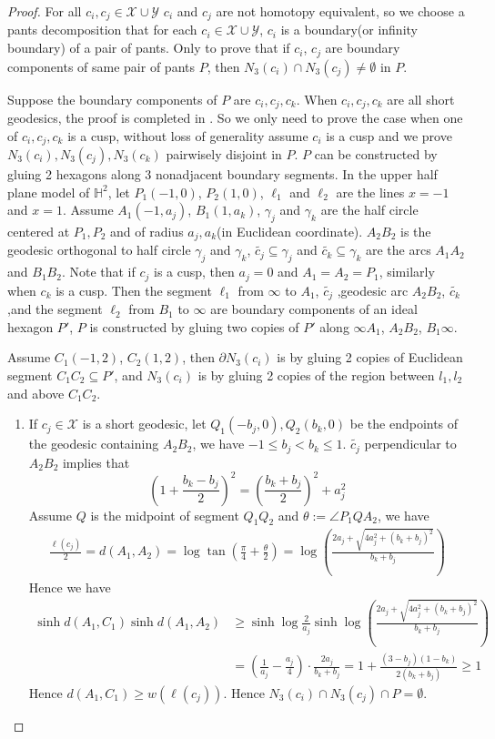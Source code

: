 \documentclass[11pt, a4paper]{article}
\theoremstyle{definition}
\theoremstyle{remark}
\newcommand{\bbh}{\mathbb{H}}
\newcommand{\calx}{\mathcal{X}}
\newcommand{\caly}{\mathcal{Y}}
\newcommand{\bracket}[1]{\left( #1 \right)}
\begin{document}
\begin{proof}
 For all $c_i,c_j\in\calx\cup\caly$ $c_i$ and $c_j$ are not homotopy equivalent, so we choose a pants decomposition that for each $c_i\in\calx\cup\caly$, $c_i$ is a boundary(or infinity boundary) of a pair of pants. Only to prove that if $c_i$, $c_j$ are boundary components of same pair of pants $P$, then $N_3(c_i)\cap N_3(c_j)\neq\emptyset$ in $P$.

Suppose the boundary components of $P$ are $c_i,c_j,c_k$. When $c_i,c_j,c_k$ are all short geodesics, the proof is completed in \cite{FM2012}. So we only need to prove the case when one of $c_i,c_j,c_k$ is a cusp, without loss of generality assume $c_i$ is a cusp and we prove $N_3(c_i), N_3(c_j), N_3(c_k)$ pairwisely disjoint in $P$. $P$ can be constructed by gluing 2 hexagons along 3 nonadjacent boundary segments. In the upper half plane model of $\bbh^2$, let $P_1(-1,0)$, $P_2(1,0)$, $\ell_1$ and $\ell_2$ are the lines $x=-1$ and $x=1$. Assume $A_1(-1,a_j)$, $B_1(1,a_k)$, $\gamma_j$ and $\gamma_k$ are the half circle centered at $P_1, P_2$ and of radius $a_j,a_k$(in Euclidean coordinate). $A_2B_2$ is the geodesic orthogonal to half circle $\gamma_j$ and $\gamma_k$, $\widetilde{c_j}\subseteq\gamma_j$ and $\widetilde{c_k}\subseteq\gamma_k$ are the arcs $A_1A_2$ and $B_1B_2$. Note that if $c_j$ is a cusp, then $a_j=0$ and $A_1=A_2=P_1$, similarly when $c_k$ is a cusp. Then  the segment $\ell_1$ from $\infty$ to $A_1$, $\widetilde{c_j}$ ,geodesic arc $A_2B_2$, $\widetilde{c_k}$,and the segment $\ell_2$ from $B_1$ to $\infty$ are boundary components of an ideal hexagon $P'$, $P$ is constructed by gluing two copies of $P'$ along $\infty A_1$, $A_2B_2$, $B_1\infty$.

Assume $C_1(-1,2)$, $C_2(1,2)$, then $\partial N_3(c_i)$ is by gluing 2 copies of Euclidean segment $C_1C_2\subseteq P'$, and $N_3(c_i)$ is by gluing 2 copies of the region between $l_1,l_2$ and above $C_1C_2$. 
\begin{enumerate}
\item
If $c_j\in\calx$ is a short geodesic, let $Q_1(-b_j,0),Q_2(b_k,0)$ be the endpoints of the geodesic containing $A_2B_2$, we have $-1\leqslant b_j<b_k\leqslant1$. $\widetilde{c_j}$ perpendicular to $A_2B_2$ implies that
$$\bracket{1+\frac{b_k-b_j}2}^2=\bracket{\frac{b_k+b_j}2}^2+a_j^2$$ 
Assume $Q$ is the midpoint of segment $Q_1Q_2$ and $\theta:=\angle{P_1QA_2}$, we have
\begin{align*}
\frac{\ell(c_j)}2=d(A_1,A_2)=\log\tan\bracket{{\frac{\pi}4+\frac{\theta}2}}=\log\bracket{\frac{2a_j+\sqrt{4a_j^2+(b_k+b_j)^2}}{b_k+b_j}}
\end{align*}
Hence we have
\begin{align*}
\sinh{d(A_1,C_1)}\sinh{d(A_1,A_2)}&\geqslant \sinh\log\frac2{a_j}\sinh\log\bracket{\frac{2a_j+\sqrt{4a_j^2+(b_k+b_j)^2}}{b_k+b_j}}\\
&=\bracket{\frac1{a_j}-\frac{a_j}4}\cdot\frac{2a_j}{b_k+b_j}=1+\frac{(3-b_j)(1-b_k)}{2(b_k+b_j)}\geqslant1
\end{align*}
Hence $d(A_1,C_1)\geqslant w(\ell(c_j))$. Hence $N_3(c_i)\cap N_3(c_j)\cap P=\emptyset$.


\end{enumerate}
\end{proof}
\end{document}
